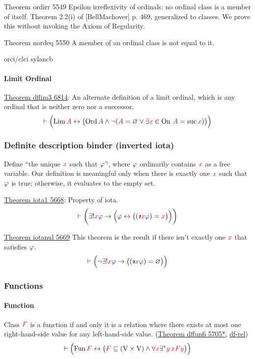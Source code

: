 \documentclass[12pt, letterpaper]{article}
\newcommand{\red}[1]{{\color{red} #1}}
\newcommand{\blue}[1]{{\color{blue} #1}}
\newcommand{\purple}[1]{{\color{purple} #1}}
\renewcommand{\emptyset}{\varnothing}
\newcommand{\provable}{\vdash}
\newcommand{\ra}{\rightarrow}
\newcommand{\lra}{\leftrightarrow}
\newcommand{\setvar}{\red}
\newcommand{\wff}{\blue}
\newcommand{\classvar}{\purple}
\newcommand{\wffphi}{\wff{\varphi}}
\newcommand{\sx}{\setvar{x}}
\newcommand{\sy}{\setvar{y}}
\newcommand{\clA}{\classvar{A}}
\newcommand{\clF}{\classvar{F}}
\newcommand{\VV}{\mathrm{V}}
\newcommand{\unique}{\exists^*}
\newcommand{\rotiota}[2]{\rotatebox[origin=c]{180}{$#1\boldsymbol{\iota}$}}
\newcommand{\iiota}{{\mathpalette\rotiota\relax}}
\newcommand{\defdes}{\iiota}
\newcommand{\Fun}{{\operatorname{Fun}\,}}
\newcommand{\Ord}{{\operatorname{Ord}\,}}
\newcommand{\suc}{{\operatorname{suc}\,}}
\newcommand{\Lim}{{\operatorname{Lim}\,}}
\newcommand{\On}{{\operatorname{On}\,}}
\theoremstyle{definition}
\theoremstyle{remark}
\theoremstyle{definition}
\theoremstyle{plain}
\begin{document}
	Theorem	ordirr 5549	Epsilon irreflexivity of ordinals: no ordinal class is a member of itself. Theorem 2.2(i) of [BellMachover] p. 469, generalized to classes. We prove this without invoking the Axiom of Regularity.
	
	Theorem	nordeq 5550	A member of an ordinal class is not equal to it. 
	
	orci/clci
	sylancb
	\paragraph{Limit Ordinal}	
	\href{http://us.metamath.org/mpeuni/dflim3.html}
	{Theorem dflim3 6814}:
	An alternate definition of a limit ordinal, which is any ordinal that is neither zero nor a successor.
	\[\provable\Big(\Lim\clA\lra\big(\Ord\clA\land\neg(\clA=\emptyset
	\lor\exists\sx\in\On\,\clA=\suc\sx)\big)\Big) \]

	\subsubsection{ Definite description binder (inverted iota)}		
	
	Define ``the unique $\sx$ such that $\wffphi$'',
	where $\wffphi$ ordinarily contains $\sx$ as a free variable.
	Our definition is meaningful only when there is exactly one $\sx$
	such that $\wffphi$ is true;
	otherwise, it evaluates to the empty set.
	
	\href{http://us.metamath.org/mpeuni/iota1.html}{Theorem iota1 5668}:
	Property of iota.
	\[\provable\bigg(\exists!\sx\wffphi\ra\Big(\wffphi\lra\big((\defdes \sx\wffphi) = \sx\big)\Big)\bigg) \]
	
	\href{http://us.metamath.org/mpeuni/iotanul.html}{Theorem iotanul 5669}
	This theorem is the result if there isn't exactly one $\sx$
	that satisfies $\wffphi$.
	\[\provable\Big( \neg\exists!\sx\wffphi\ra \big((\defdes\sx\wffphi)=\emptyset\big) \Big) \]
	
	\subsubsection{Functions}
	\paragraph{Function}
	Class $\clF$ is a function if and only it is a relation
	where there exists at most one right-hand-side value for any left-hand-side value.
	(\href{http://us.metamath.org/mpeuni/mmtheorems58.html}{Theorem dffun6 5705*},
	\href{http://us.metamath.org/mpeuni/df-rel.html}{df-rel})
	\[\provable\Big(\Fun\clF\lra\big(\clF\subseteq(\VV\times\VV)\land\forall\sx\unique\sy\,\sx\clF\sy\big)\Big) \]
\end{document}
